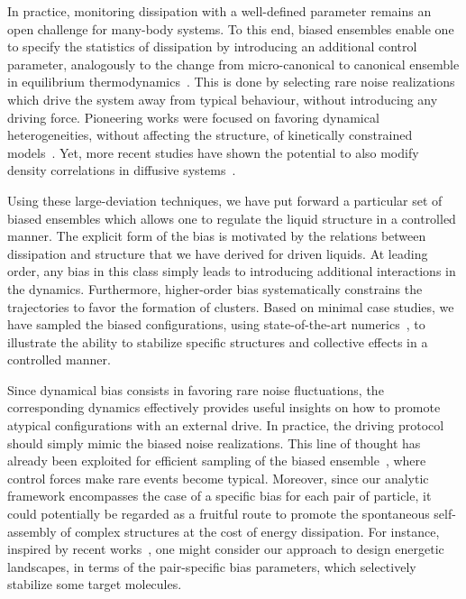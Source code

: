 \documentclass[superscriptaddress, twocolumn, prx, longbibliography, nofootinbib]{revtex4-1}
\begin{document}
In practice, monitoring dissipation with a well-defined parameter remains an open challenge for many-body systems. To this end, biased ensembles enable one to specify the statistics of dissipation by introducing an additional control parameter, analogously to the change from micro-canonical to canonical ensemble in equilibrium thermodynamics~\cite{Chetrite2013, Jack2010}. This is done by selecting rare noise realizations which drive the system away from typical behaviour, without introducing any driving force. Pioneering works were focused on favoring dynamical heterogeneities, without affecting the structure, of kinetically constrained models~\cite{garrahan2007, Hedges2009, Pitard2011, Speck2012, Bodineau2012a}. Yet, more recent studies have shown the potential to also modify density correlations in diffusive systems~\cite{Jack2014, Cagnetta2017, Nemoto2019}.


Using these large-deviation techniques, we have put forward a particular set of biased ensembles which allows one to regulate the liquid structure in a controlled manner. The explicit form of the bias is motivated by the relations between dissipation and structure that we have derived for driven liquids. At leading order, any bias in this class simply leads to introducing additional interactions in the dynamics. Furthermore, higher-order bias systematically constrains the trajectories to favor the formation of clusters. Based on minimal case studies, we have sampled the biased configurations, using state-of-the-art numerics~\cite{Giadina2006, tailleur2007probing, Hurtado2009, Nemoto2016, Ray2018, Klymko2018, Brewer2018}, to illustrate the ability to stabilize specific structures and collective effects in a controlled manner. 


Since dynamical bias consists in favoring rare noise fluctuations, the corresponding dynamics effectively provides useful insights on how to promote atypical configurations with an external drive. In practice, the driving protocol should simply mimic the biased noise realizations. This line of thought has already been exploited for efficient sampling of the biased ensemble~\cite{Nemoto2016, Jack2017, Jack2018, Ferre2018}, where control forces make rare events become typical. Moreover, since our analytic framework encompasses the case of a specific bias for each pair of particle, it could potentially be regarded as a fruitful route to promote the spontaneous self-assembly of complex structures at the cost of energy dissipation. For instance, inspired by recent works~\cite{Murugan2015, Murugan2017b}, one might consider our approach to design energetic landscapes, in terms of the pair-specific bias parameters, which selectively stabilize some target molecules. 
\end{document}
